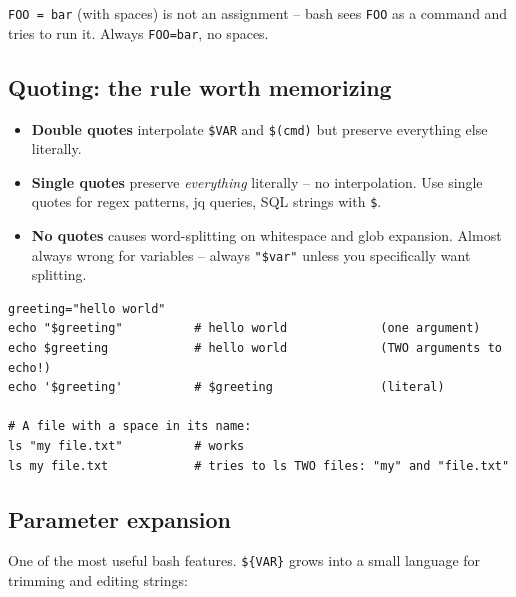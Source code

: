 \documentclass[11pt,a4paper]{article}
\begin{document}
\begin{gotcha}
\texttt{FOO = bar} (with spaces) is not an assignment -- bash sees
\texttt{FOO} as a command and tries to run it. Always
\texttt{FOO=bar}, no spaces.
\end{gotcha}

\subsection*{Quoting: the rule worth memorizing}

\begin{itemize}[leftmargin=*]
\item \textbf{Double quotes} interpolate \texttt{\$VAR} and
\texttt{\$(cmd)} but preserve everything else literally.
\item \textbf{Single quotes} preserve \emph{everything} literally --
no interpolation. Use single quotes for regex patterns, jq queries,
SQL strings with \texttt{\$}.
\item \textbf{No quotes} causes word-splitting on whitespace and
glob expansion. Almost always wrong for variables -- always
\texttt{"\$var"} unless you specifically want splitting.
\end{itemize}

\begin{lstlisting}[style=bashstyle]
greeting="hello world"
echo "$greeting"          # hello world             (one argument)
echo $greeting            # hello world             (TWO arguments to echo!)
echo '$greeting'          # $greeting               (literal)

# A file with a space in its name:
ls "my file.txt"          # works
ls my file.txt            # tries to ls TWO files: "my" and "file.txt"
\end{lstlisting}

\subsection*{Parameter expansion}

One of the most useful bash features. \texttt{\$\{VAR\}} grows into
a small language for trimming and editing strings:
\end{document}
